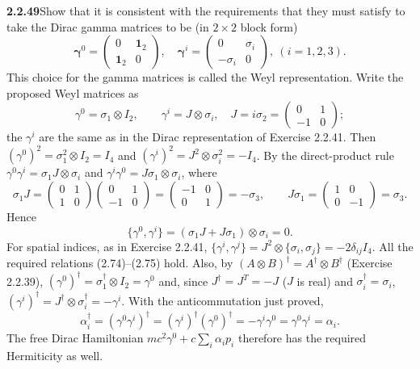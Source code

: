 \par\bigskip
\noindent\textbf{2.2.49}\quad Show that it is consistent with the requirements
that they must satisfy to take the Dirac gamma matrices to be (in $2\times2$
block form)
\[
\boldsymbol{\gamma}^{0}=\begin{pmatrix}0&\mathbf{1}_{2}\\
\mathbf{1}_{2}&0\end{pmatrix},\quad
\boldsymbol{\gamma}^{i}=\begin{pmatrix}0&\sigma_{i}\\
-\sigma_{i}&0\end{pmatrix},\ (i=1,2,3).
\]
This choice for the gamma matrices is called the Weyl representation.
\solution
Write the proposed Weyl matrices as
\[
\gamma^0=\sigma_1\otimes I_2,\qquad
\gamma^i=J\otimes\sigma_i,\quad
J=i\sigma_2=\begin{pmatrix}0&1\\-1&0\end{pmatrix};
\]
the $\gamma^i$ are the same as in the Dirac representation of
Exercise 2.2.41.
Then $(\gamma^0)^2=\sigma_1^2\otimes I_2=I_4$ and
$(\gamma^i)^2=J^2\otimes\sigma_i^2=-I_4$.
By the direct-product rule $\gamma^0\gamma^i=\sigma_1J\otimes\sigma_i$
and $\gamma^i\gamma^0=J\sigma_1\otimes\sigma_i$, where
\[
\sigma_1J=\begin{pmatrix}0&1\\1&0\end{pmatrix}
\begin{pmatrix}0&1\\-1&0\end{pmatrix}
=\begin{pmatrix}-1&0\\0&1\end{pmatrix}=-\sigma_3,\qquad
J\sigma_1=\begin{pmatrix}1&0\\0&-1\end{pmatrix}=\sigma_3.
\]
Hence
\[
\{\gamma^0,\gamma^i\}=(\sigma_1J+J\sigma_1)\otimes\sigma_i=0.
\]
For spatial indices, as in Exercise 2.2.41,
$\{\gamma^i,\gamma^j\}=J^2\otimes\{\sigma_i,\sigma_j\}
=-2\delta_{ij}I_4$. All the required relations (2.74)--(2.75) hold.
Also, by $(A\otimes B)^\dagger=A^\dagger\otimes B^\dagger$
(Exercise 2.2.39), $(\gamma^0)^\dagger=\sigma_1^\dagger\otimes I_2=\gamma^0$
and, since $J^\dagger=J^T=-J$ ($J$ is real) and
$\sigma_i^\dagger=\sigma_i$,
$(\gamma^i)^\dagger=J^\dagger\otimes\sigma_i^\dagger=-\gamma^i$. With
the anticommutation just proved,
\[
\alpha_i^\dagger=(\gamma^0\gamma^i)^\dagger
=(\gamma^i)^\dagger(\gamma^0)^\dagger
=-\gamma^i\gamma^0=\gamma^0\gamma^i=\alpha_i.
\]
The free Dirac Hamiltonian $mc^2\gamma^0+c\sum_i\alpha_ip_i$
therefore has the required Hermiticity as well.

